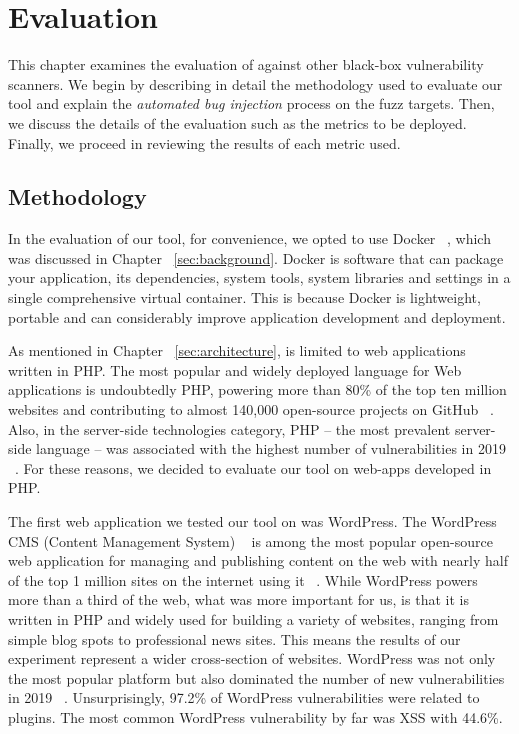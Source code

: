 \chapter{Evaluation}
\label{sec:evaluation}
\minitoc
\vspace*{1cm}

This chapter examines the evaluation of \pname{} against other black-box vulnerability scanners. We begin by describing in detail the methodology used to evaluate our tool and explain the \emph{automated bug injection} process on the fuzz targets. Then, we discuss the details of the evaluation such as the metrics to be deployed. Finally, we proceed in reviewing the results of each metric used.

\section{Methodology}
\label{sec:dockerStack}
In the evaluation of our tool, for convenience, we opted to use Docker ~\cite{docker_def}, which was discussed in Chapter ~\ref{sec:background}. Docker is software that can package your application, its dependencies, system tools, system libraries and settings in a single comprehensive virtual container. This is because Docker is lightweight, portable and can considerably improve application development and deployment.

As mentioned in Chapter ~\ref{sec:architecture}, \pname{} is limited to web applications written in PHP. The most popular and widely deployed language for Web applications is undoubtedly PHP, powering more than 80\% of the top ten million websites and contributing to almost 140,000 open-source projects on GitHub ~\cite{githubinfo}. Also, in the server-side technologies category, PHP – the most prevalent server-side language – was associated with the highest number of vulnerabilities in 2019 ~\cite{vulnerabilities2019state}. For these reasons, we decided to evaluate our tool on web-apps developed in PHP.

The first web application we tested our tool on was WordPress. The WordPress CMS (Content Management System) ~\cite{docker_def} is among the most popular open-source web application for managing and publishing content on the web with nearly half of the top 1 million sites on the internet using it ~\cite{cmsusage}. While WordPress powers more than a third of the web, what was more important for us, is that it is written in PHP and widely used for building a variety of websites, ranging from simple blog spots to professional news sites. This means the results of our experiment represent a wider cross-section of websites. WordPress was not only the most popular platform but also dominated the number of new vulnerabilities in 2019 ~\cite{vulnerabilities2019state}. Unsurprisingly, 97.2\% of WordPress vulnerabilities were related to plugins. The most common WordPress vulnerability by far was XSS with 44.6\%. 

